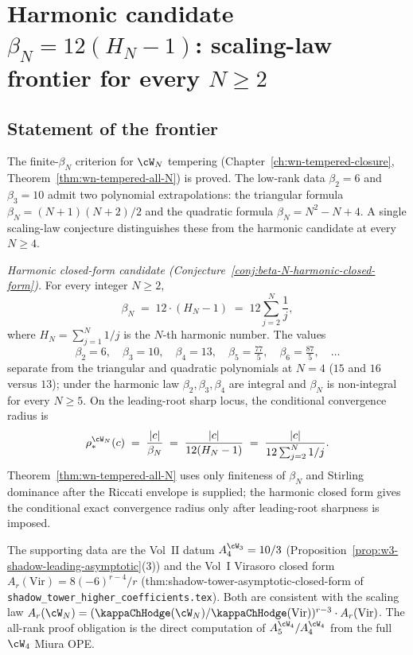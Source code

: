 \chapter{Harmonic candidate $\beta_N = 12(H_N - 1)$: scaling-law frontier
for every $N \ge 2$}
\label{ch:beta-N-closed-form-all}

\section*{Statement of the frontier}

The finite-$\beta_N$ criterion for $\cW_N$ tempering
(Chapter~\ref{ch:wn-tempered-closure},
Theorem~\ref{thm:wn-tempered-all-N}) is proved.
The low-rank data $\beta_2 = 6$ and $\beta_3 = 10$ admit two
polynomial extrapolations: the triangular formula
$\beta_N = (N+1)(N+2)/2$ and the quadratic formula
$\beta_N = N^2 - N + 4$. A single scaling-law conjecture distinguishes
these from the harmonic candidate at every $N \ge 4$.

\emph{Harmonic closed-form candidate
(Conjecture~\ref{conj:beta-N-harmonic-closed-form}).} For every
integer $N \ge 2$,
\[
 \beta_N \;=\; 12 \cdot (H_N - 1)
 \;=\; 12 \sum_{j = 2}^{N} \frac{1}{j},
\]
where $H_N = \sum_{j = 1}^{N} 1/j$ is the $N$-th harmonic number.
The values
\[
 \beta_2 = 6, \quad \beta_3 = 10, \quad
 \beta_4 = 13, \quad \beta_5 = \tfrac{77}{5}, \quad
 \beta_6 = \tfrac{87}{5}, \quad \ldots
\]
separate from the triangular and quadratic polynomials at $N = 4$
($15$ and $16$ versus $13$); under the harmonic law $\beta_2,\beta_3,
\beta_4$ are integral and $\beta_N$ is non-integral for every
$N\geq 5$. On the leading-root sharp locus, the conditional convergence
radius is
\[
 \rho_*^{\cW_N}(c)
 \;=\;
 \frac{\lvert c \rvert}{\beta_N}
 \;=\;
 \frac{\lvert c \rvert}{12(H_N - 1)}
 \;=\;
 \frac{\lvert c \rvert}{12 \sum_{j = 2}^{N} 1/j}.
\]
Theorem~\ref{thm:wn-tempered-all-N} uses only finiteness of $\beta_N$
and Stirling dominance after the Riccati envelope is supplied; the
harmonic closed form gives the conditional exact convergence radius only
after leading-root sharpness is imposed.

The supporting data are the Vol~II datum $A_4^{\cW_3} = 10/3$
(Proposition~\ref{prop:w3-shadow-leading-asymptotic}(3)) and the Vol~I
Virasoro closed form $A_r(\mathrm{Vir}) = 8(-6)^{r-4}/r$
(\textsf{thm:shadow-tower-asymptotic-closed-form} of
\texttt{shadow\_tower\_higher\_coefficients.tex}). Both are consistent
with the scaling law
$A_r(\cW_N) = (\kappaChHodge(\cW_N)/\kappaChHodge(\mathrm{Vir}))^{r-3} \cdot
A_r(\mathrm{Vir})$. The all-rank proof obligation is the direct
computation of $A_5^{\cW_4}/A_4^{\cW_4}$ from the full $\cW_4$ Miura
OPE.

